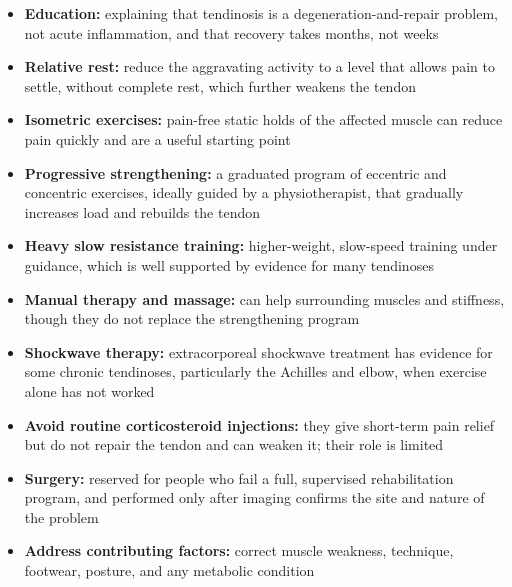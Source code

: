 \begin{itemize}
    \item \textbf{Education:} explaining that tendinosis is a degeneration-and-repair problem, not acute inflammation, and that recovery takes months, not weeks
    \item \textbf{Relative rest:} reduce the aggravating activity to a level that allows pain to settle, without complete rest, which further weakens the tendon
    \item \textbf{Isometric exercises:} pain-free static holds of the affected muscle can reduce pain quickly and are a useful starting point
    \item \textbf{Progressive strengthening:} a graduated program of eccentric and concentric exercises, ideally guided by a physiotherapist, that gradually increases load and rebuilds the tendon
    \item \textbf{Heavy slow resistance training:} higher-weight, slow-speed training under guidance, which is well supported by evidence for many tendinoses
    \item \textbf{Manual therapy and massage:} can help surrounding muscles and stiffness, though they do not replace the strengthening program
    \item \textbf{Shockwave therapy:} extracorporeal shockwave treatment has evidence for some chronic tendinoses, particularly the Achilles and elbow, when exercise alone has not worked
    \item \textbf{Avoid routine corticosteroid injections:} they give short-term pain relief but do not repair the tendon and can weaken it; their role is limited
    \item \textbf{Surgery:} reserved for people who fail a full, supervised rehabilitation program, and performed only after imaging confirms the site and nature of the problem
    \item \textbf{Address contributing factors:} correct muscle weakness, technique, footwear, posture, and any metabolic condition
\end{itemize}

